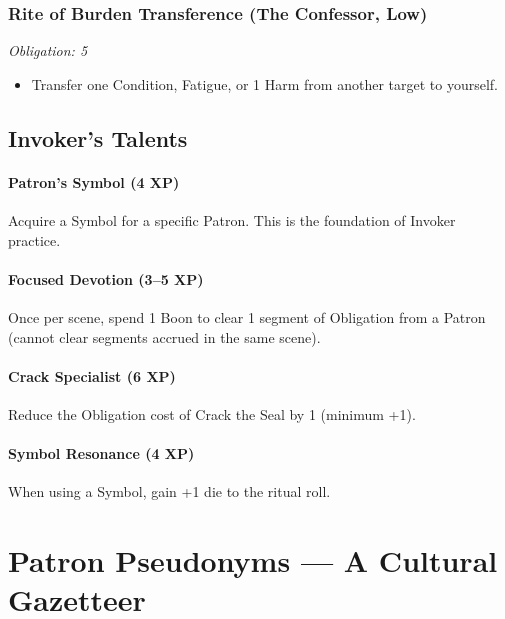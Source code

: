 \subsubsection*{Rite of Burden Transference (The Confessor, Low)}
\textit{Obligation: 5}
\begin{itemize}
  \item Transfer one Condition, Fatigue, or 1 Harm from another target to yourself.
\end{itemize}

\subsection{Invoker's Talents}

\paragraph*{Patron's Symbol (4 XP)}
Acquire a Symbol for a specific Patron. This is the foundation of Invoker practice.

\paragraph*{Focused Devotion (3--5 XP)}
Once per scene, spend 1 Boon to clear 1 segment of Obligation from a Patron (cannot clear segments accrued in the same scene).

\paragraph*{Crack Specialist (6 XP)}
Reduce the Obligation cost of Crack the Seal by 1 (minimum +1).

\paragraph*{Symbol Resonance (4 XP)}
When using a Symbol, gain +1 die to the ritual roll.

\section{Patron Pseudonyms --- A Cultural Gazetteer}


